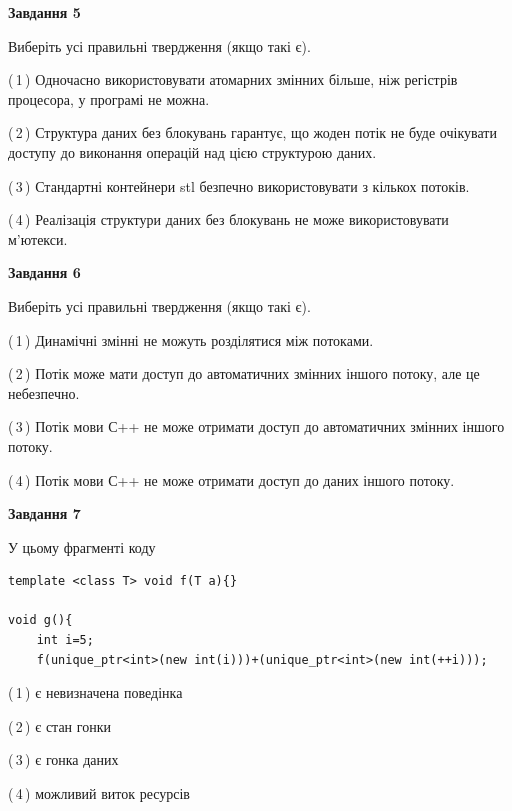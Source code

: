 \documentclass[12pt, ukrainian]{article}
\begin{document}
\begin {large}
{\begin{center}
\textbf{Завдання 5}
\end{center}

Виберіть усі правильні твердження (якщо такі є).\par
\vspace{2mm}

(\,1\,) Одночасно використовувати атомарних змінних більше, ніж регістрів процесора, у програмі не можна.%

(\,2\,) Структура даних без блокувань гарантує, що жоден потік не буде очікувати доступу до виконання операцій над цією структурою даних.%

(\,3\,) Стандартні контейнери stl безпечно використовувати з кількох потоків.%

(\,4\,) Реалізація структури даних без блокувань не може використовувати м’ютекси.%
\newpage


\begin{center}
\textbf{Завдання 6}
\end{center}

Виберіть усі правильні твердження (якщо такі є).\par
\vspace{2mm}

(\,1\,) Динамічні змінні не можуть розділятися між потоками.%

(\,2\,) Потік може мати доступ до автоматичних змінних іншого потоку, але це небезпечно.%

(\,3\,) Потік мови С++ не може отримати доступ до автоматичних змінних іншого потоку.%

(\,4\,) Потік мови С++ не може отримати доступ до даних іншого потоку.%


\begin{center}
\textbf{Завдання 7}
\end{center}

У цьому фрагменті коду
\begin{verbatim}
template <class T> void f(T a){}

void g(){
    int i=5;
    f(unique_ptr<int>(new int(i)))+(unique_ptr<int>(new int(++i)));
\end{verbatim}
(\,1\,) є невизначена поведінка%

(\,2\,) є стан гонки%

(\,3\,) є гонка даних%

(\,4\,) можливий виток ресурсів%

}
\end {large}

\vspace{4mm}
\newpage
\end{document}
